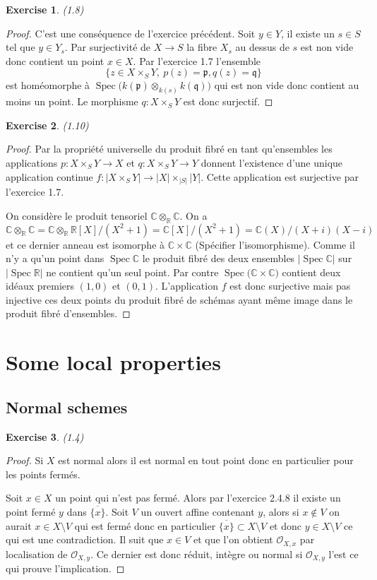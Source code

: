 \documentclass[A4, 11pt]{article}
\newtheorem{exer}{Exercise}
\def\C{{\mathbb C}}
\def\R{{\mathbb R}}
\def\Spec{ \operatorname{Spec}}
\begin{document}
 \begin{exer}(1.8)
 \end{exer}
 \begin{proof}
 C'est une conséquence de l'exercice précédent. Soit $y\in Y$, il existe un $s\in S$ tel que $y\in Y_s$. Par surjectivité de $X\rightarrow S$ la fibre $X_s$ au dessus de $s$ est non vide donc contient un point $x\in X$. Par l'exercice 1.7 l'ensemble 
$$\{z\in X\times_S Y, ~p(z)=\mathfrak{p}, q(z)=\mathfrak{q}\}$$
est homéomorphe à  $\Spec \big( k(\mathfrak{p}) \otimes_{k(s)} k(\mathfrak{q}) \big)$ qui est non vide donc contient au moins un point. Le morphisme $q\colon X\times_S Y$ est donc surjectif.
  \end{proof}
 \begin{exer}(1.10)
 \end{exer}
 \begin{proof}
 Par la propriété universelle du produit fibré en tant qu'ensembles les applications $p\colon X\times_S Y \rightarrow X$ et $q\colon X\times_S Y \rightarrow Y$ donnent l'existence d'une unique application continue $f\colon |X\times_S Y| \rightarrow |X|\times_{|S|} |Y|$. Cette application est surjective par l'exercice 1.7.
 
 On considère le produit tensoriel $\C\otimes_{\R} \C$. On a 
 $$\C\otimes_{\R}\C= \C\otimes_{\R} \R[X]/(X^2+1)= \C[X]/(X^2+1)=\C(X)/(X+i)(X-i)$$
 et ce dernier anneau est isomorphe à $\C\times \C$ (Spécifier l'isomorphisme). 
 Comme il n'y a qu'un point dans $\Spec \C$ le produit fibré des deux ensembles $|\Spec \C|$ sur $|\Spec \R|$ ne contient qu'un seul point. Par contre $\Spec \big(\C \times \C \big)$ contient deux idéaux premiers $(1,0)$ et $(0,1)$. L'application $f$ est donc surjective mais pas injective ces deux points du produit fibré de schémas ayant même image dans le produit fibré d'ensembles. 
 \end{proof}
 \section{Some local properties}
 \subsection{Normal schemes}
 \begin{exer}(1.4)
 \end{exer}
 \begin{proof}
 Si $X$ est normal alors il est normal en tout point donc en particulier pour les points fermés.
 
 Soit $x\in X$ un point qui n'est pas fermé. Alors par l'exercice 2.4.8 il existe un point fermé $y$ dans $\overline{\{x\}}$. Soit $V$ un ouvert affine contenant $y$, alors si $x\notin V$ on aurait $x\in X\setminus V$ qui est fermé donc en particulier $\overline{\{x\}}\subset X\setminus V$ et donc $y \in X\setminus V$ ce qui est une contradiction. Il suit que $x\in V$ et que l'on obtient $\mathcal{O}_{X,x}$ par localisation de $\mathcal{O}_{X,y}$. Ce dernier est donc réduit, intègre ou normal si $\mathcal{O}_{X,y}$ l'est ce qui prouve l'implication.
 \end{proof}
 
\end{document}
